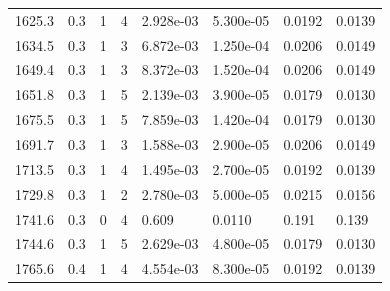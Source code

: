 \documentclass[preview]{standalone}
\begin{document}
{{{\begin{tabular}{L{1.2cm}C{1.2cm} C{0.3cm}C{0.5cm} C{1.4cm}C{1.4cm} C{1.4cm}C{1.4cm}}
  1625.3  &   0.3  & 1     &  4 &  2.928e-03  & 5.300e-05  & 0.0192 &  0.0139   \\ 
  1634.5  &   0.3  & 1     &  3 &  6.872e-03  & 1.250e-04  & 0.0206 &  0.0149   \\ 
  1649.4  &   0.3  & 1     &  3 &  8.372e-03  & 1.520e-04  & 0.0206 &  0.0149   \\ 
  1651.8  &   0.3  & 1     &  5 &  2.139e-03  & 3.900e-05  & 0.0179 &  0.0130   \\ 
  1675.5  &   0.3  & 1     &  5 &  7.859e-03  & 1.420e-04  & 0.0179 &  0.0130   \\ 
  1691.7  &   0.3  & 1     &  3 &  1.588e-03  & 2.900e-05  & 0.0206 &  0.0149   \\ 
  1713.5  &   0.3  & 1     &  4 &  1.495e-03  & 2.700e-05  & 0.0192 &  0.0139   \\ 
  1729.8  &   0.3  & 1     &  2 &  2.780e-03  & 5.000e-05  & 0.0215 &  0.0156   \\ 
  1741.6  &   0.3  & 0     &  4 &  0.609  & 0.0110  & 0.191 &  0.139   \\ 
  1744.6  &   0.3  & 1     &  5 &  2.629e-03  & 4.800e-05  & 0.0179 &  0.0130   \\ 
  1765.6  &   0.4  & 1     &  4 &  4.554e-03  & 8.300e-05  & 0.0192 &  0.0139   \\ 
\hline 
\end{tabular} 

}}}
\end{document}
